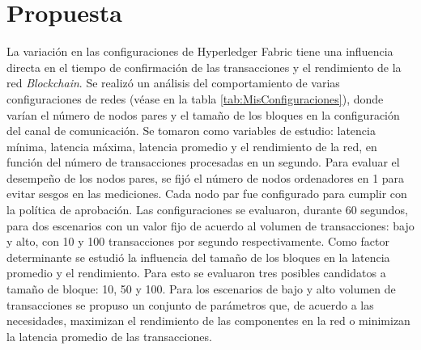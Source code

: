 \chapter{Propuesta}\label{chapter:proposal}

La variaci\'on en las configuraciones de Hyperledger Fabric tiene una influencia directa en el tiempo de confirmaci\'on de las transacciones y el rendimiento de la red \emph{Blockchain}. Se realiz\'o un an\'alisis del comportamiento de varias configuraciones de redes (v\'ease en la tabla \ref{tab:MisConfiguraciones}), donde var\'ian el n\'umero de nodos pares y el tama\~no de los bloques en la configuraci\'on del canal de comunicaci\'on. Se tomaron como variables de estudio: latencia m\'inima, latencia m\'axima, latencia promedio y el rendimiento de la red, en funci\'on del n\'umero de transacciones procesadas en un segundo. Para evaluar el desempe\~no de los nodos pares, se fij\'o el n\'umero de nodos ordenadores en 1 para evitar sesgos en las mediciones. Cada nodo par fue configurado para cumplir con la pol\'itica de aprobaci\'on. Las configuraciones se evaluaron, durante 60 segundos, para dos escenarios con un valor fijo de acuerdo al volumen de transacciones: bajo y alto, con 10 y 100 transacciones por segundo respectivamente. Como factor determinante se estudi\'o la influencia del tama\~no de los bloques en la latencia promedio y el rendimiento. Para esto se evaluaron tres posibles candidatos a tama\~no de bloque: 10, 50 y 100. Para los escenarios de bajo y alto volumen de transacciones se propuso un conjunto de par\'ametros que, de acuerdo a las necesidades, maximizan el rendimiento de las componentes en la red o minimizan la latencia promedio de las transacciones.